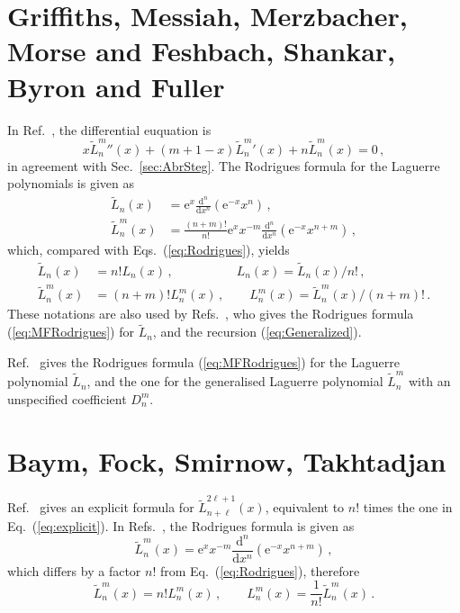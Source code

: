 \documentclass[a4paper,12pt,final]{article}
\def\d{\mathrm{d}}
\def\e{\mathrm{e}}
\begin{document}
\section{Griffiths, Messiah, Merzbacher, Morse and Feshbach, Shankar, Byron and Fuller}
In Ref.\ \cite{MF}, the differential euquation is
\begin{equation}
 \label{eq:MFODE}
 x {\tilde L}_n^m {}''(x) +(m+1-x){\tilde L}_n^m {}'(x) + n{\tilde L}_n^m {}(x)=0\,,
\end{equation}
in agreement with Sec.\ \ref{sec:AbrSteg}. The Rodrigues formula for the Laguerre polynomials is given as
\begin{equation}
 \label{eq:MFRodrigues}
 \begin{aligned}
  {\tilde L}_n(x) &= \e^x \frac{\d^n}{\d x^n} (\e^{-x} x^n)\,,\\
  {\tilde L}_n^m(x) &= \frac{(n+m)!}{n!} \e^x x^{-m} \frac{\d^n}{\d x^n} (\e^{-x} x^{n+m})\,,
 \end{aligned}
\end{equation}
which, compared with Eqs.\ (\ref{eq:Rodrigues}), yields
\begin{equation}
 \label{eq:MFidentify}
 \begin{aligned}
  {\tilde L}_n (x) &= n! L_n(x)\,,\quad\quad\quad\quad\quad L_n(x) = {\tilde L}_n(x)/n!\,,\\
  {\tilde L}_n^m(x) &= (n+m)! L_n^m(x)\,,\quad\quad L_n^m(x) = {\tilde L}_n^m(x)/(n+m)!\,.
 \end{aligned}
\end{equation}
These notations are also used by Refs.\ \cite{Griffiths, Messiah, Merzbacher, Shankar}, who gives the Rodrigues formula (\ref{eq:MFRodrigues}) for ${\tilde L}_n$, and the recursion (\ref{eq:Generalized}).

Ref.\ \cite{BF} gives the Rodrigues formula (\ref{eq:MFRodrigues}) for the Laguerre polynomial ${\tilde L}_n$, and the one for the generalised Laguerre polynomial ${\tilde L}_n^m$ with an unspecified coefficient $D_n^m$.


\section{Baym, Fock, Smirnow, Takhtadjan}
Ref.\ \cite{Baym} gives an explicit formula for ${\tilde L}_{n+\ell}^{2\ell+1}(x)$, equivalent to $n!$ times the one in Eq.\ (\ref{eq:explicit}).
In Refs.\ \cite{Fock, S, Takhtadjan}, the Rodrigues formula is given as
\begin{equation}
 \label{eq:SRodrigues}
 {\tilde L}_n^m(x) = \e^x x^{-m} \frac{\d^n}{\d x^n}(\e^{-x}x^{n+m})\,,
\end{equation}
which differs by a factor $n!$ from Eq.\ (\ref{eq:Rodrigues}), therefore
\begin{equation}
 \label{eq:Sidentify}
 {\tilde L}_n^m(x) = n! L_n^m(x)\,,\quad\quad L_n^m(x) = \frac{1}{n!}{\tilde L}_n^m(x)\,.
\end{equation}
\end{document}
